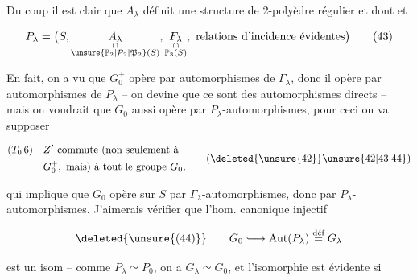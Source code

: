 
Du coup il est clair que $A_\lambda$ définit une structure de 2-polyèdre régulier et dont et 

\[
P_\lambda=\bigl(S,\underset{\substack{\cap\\\unsure{\mathbb P_2|\mathcal P_2|\mathfrak P_2}(S)}}{A_\lambda},
 \underset{\substack{\cap\\\mathbb P_3(S)}}{F_\lambda},\ \text{relations d'incidence évidentes}\bigr)
\tag*{$(43)$}
\]

En fait, on a vu que $G_0^+$ opère par automorphismes de $\Gamma_\lambda$, donc il opère par automorphismes de $P_\lambda$ -- on devine que ce sont des automorphismes directs --  mais on voudrait que $G_0$ aussi opère  par $P_\lambda$-automorphismes, pour ceci on va supposer

\[
\begin{aligned}
(T_0\,6)\quad &Z'\text{ commute (non seulement à}\\
&G_0^+,\text{ mais) à tout le groupe }G_0,
\end{aligned}\tag*{$(\deleted{\unsure{42}}\unsure{42|43|44})$}
\]


qui implique que $G_0$ opère sur $S$ par $\Gamma_\lambda$-automorphismes, donc par $P_\lambda$-automorphismes.  J'aimerais vérifier que l'hom. canonique injectif

\[
\deleted{\unsure{(44)}}\qquad G_0\lhook\joinrel\longrightarrow\operatorname{Aut}(P_\lambda)\overset{\text{déf}}{=}G_\lambda
\]

est un isom -- comme $P_\lambda\simeq P_0$, on a $G_\lambda\simeq G_0$, et l'isomorphie est évidente si
